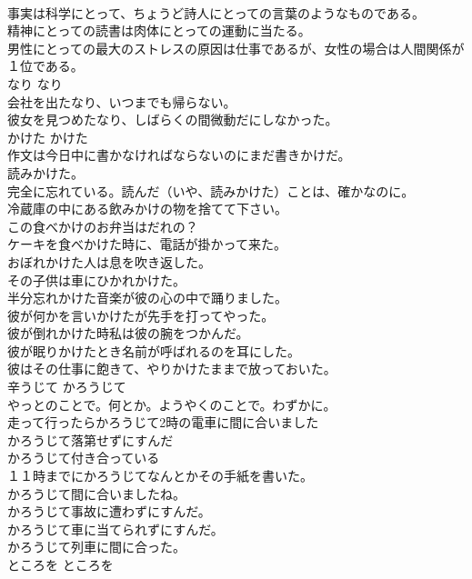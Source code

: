 \documentclass[8pt]{extreport}
\begin{document}
\begin{CJK}{UTF8}{min}
\\	事実は科学にとって、ちょうど詩人にとっての言葉のようなものである。   
\\	精神にとっての読書は肉体にとっての運動に当たる。   
\\	男性にとっての最大のストレスの原因は仕事であるが、女性の場合は人間関係が１位である。   
\\	なり	なり	
\\	会社を出たなり、いつまでも帰らない。  
\\	彼女を見つめたなり、しばらくの間微動だにしなかった。   
\\	かけた	かけた	
\\	作文は今日中に書かなければならないのにまだ書きかけだ。  
\\	読みかけた。  
\\	完全に忘れている。読んだ（いや、読みかけた）ことは、確かなのに。  
\\	冷蔵庫の中にある飲みかけの物を捨てて下さい。  
\\	この食べかけのお弁当はだれの？  
\\	ケーキを食べかけた時に、電話が掛かって来た。  
\\	おぼれかけた人は息を吹き返した。  
\\	その子供は車にひかれかけた。  
\\	半分忘れかけた音楽が彼の心の中で踊りました。  
\\	彼が何かを言いかけたが先手を打ってやった。  
\\	彼が倒れかけた時私は彼の腕をつかんだ。  
\\	彼が眠りかけたとき名前が呼ばれるのを耳にした。  
\\	彼はその仕事に飽きて、やりかけたままで放っておいた。  
\\	辛うじて	かろうじて	
\\	やっとのことで。何とか。ようやくのことで。わずかに。	
\\	走って行ったらかろうじて2時の電車に間に合いました  
\\	かろうじて落第せずにすんだ  
\\	かろうじて付き合っている  
\\	１１時までにかろうじてなんとかその手紙を書いた。   
\\	かろうじて間に合いましたね。   
\\	かろうじて事故に遭わずにすんだ。   
\\	かろうじて車に当てられずにすんだ。   
\\	かろうじて列車に間に合った。   
\\	ところを	ところを	

\end{CJK}
\end{document}

